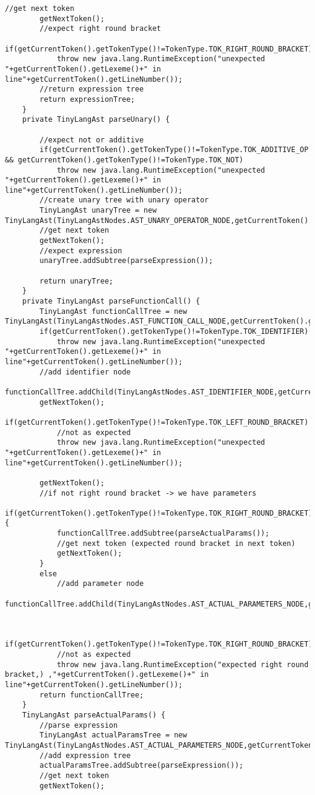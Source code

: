 \begin{lstlisting}[basicstyle=\miniscule,caption=Implementation of recursive descent parser,label=listing:rescursive descent parser implementation]
		//get next token
		getNextToken();
		//expect right round bracket
		if(getCurrentToken().getTokenType()!=TokenType.TOK_RIGHT_ROUND_BRACKET)
			throw new java.lang.RuntimeException("unexpected "+getCurrentToken().getLexeme()+" in line"+getCurrentToken().getLineNumber());
		//return expression tree
		return expressionTree;
	}
	private TinyLangAst parseUnary() {

		//expect not or additive
		if(getCurrentToken().getTokenType()!=TokenType.TOK_ADDITIVE_OP && getCurrentToken().getTokenType()!=TokenType.TOK_NOT)
			throw new java.lang.RuntimeException("unexpected "+getCurrentToken().getLexeme()+" in line"+getCurrentToken().getLineNumber());
		//create unary tree with unary operator 
		TinyLangAst unaryTree = new TinyLangAst(TinyLangAstNodes.AST_UNARY_OPERATOR_NODE,getCurrentToken().getLexeme(),getCurrentToken().getLineNumber());
		//get next token
		getNextToken();
		//expect expression
		unaryTree.addSubtree(parseExpression());
		
		return unaryTree;
	}
	private TinyLangAst parseFunctionCall() { 
		TinyLangAst functionCallTree = new TinyLangAst(TinyLangAstNodes.AST_FUNCTION_CALL_NODE,getCurrentToken().getLineNumber());
		if(getCurrentToken().getTokenType()!=TokenType.TOK_IDENTIFIER)
			throw new java.lang.RuntimeException("unexpected "+getCurrentToken().getLexeme()+" in line"+getCurrentToken().getLineNumber());
		//add identifier node
		functionCallTree.addChild(TinyLangAstNodes.AST_IDENTIFIER_NODE,getCurrentToken().getLexeme(),getCurrentToken().getLineNumber());		
		getNextToken();
		if(getCurrentToken().getTokenType()!=TokenType.TOK_LEFT_ROUND_BRACKET)
			//not as expected
			throw new java.lang.RuntimeException("unexpected "+getCurrentToken().getLexeme()+" in line"+getCurrentToken().getLineNumber());
		
		getNextToken();
		//if not right round bracket -> we have parameters 
		if(getCurrentToken().getTokenType()!=TokenType.TOK_RIGHT_ROUND_BRACKET){
			functionCallTree.addSubtree(parseActualParams());
			//get next token (expected round bracket in next token)
			getNextToken();
		}
		else
			//add parameter node
			functionCallTree.addChild(TinyLangAstNodes.AST_ACTUAL_PARAMETERS_NODE,getCurrentToken().getLineNumber());


		if(getCurrentToken().getTokenType()!=TokenType.TOK_RIGHT_ROUND_BRACKET)
			//not as expected
			throw new java.lang.RuntimeException("expected right round bracket,) ,"+getCurrentToken().getLexeme()+" in line"+getCurrentToken().getLineNumber());	
		return functionCallTree;
	}
	TinyLangAst parseActualParams() {
		//parse expression
		TinyLangAst actualParamsTree = new TinyLangAst(TinyLangAstNodes.AST_ACTUAL_PARAMETERS_NODE,getCurrentToken().getLineNumber());	
		//add expression tree
		actualParamsTree.addSubtree(parseExpression());
		//get next token
		getNextToken();


\end{lstlisting}
